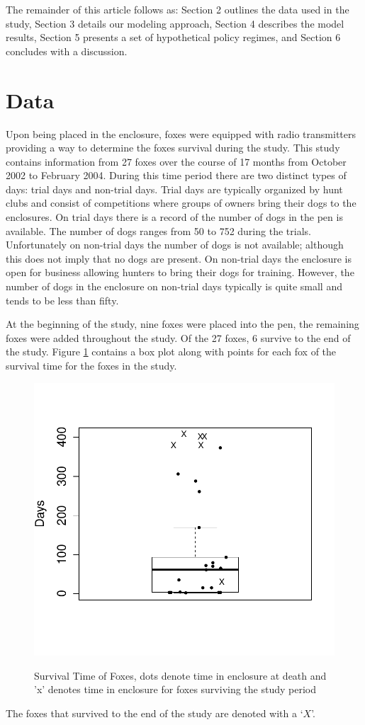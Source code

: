 \documentclass[aoas,preprint]{imsart}
\numberwithin{equation}{section}
\theoremstyle{plain}
\begin{document}
The remainder of this article follows as: Section 2 outlines the data used in the study, Section 3 details our modeling approach, Section 4 describes the model results, Section 5 presents a set of hypothetical policy regimes, and Section 6 concludes with a discussion.
\section{Data} Upon being placed in the enclosure, foxes were equipped with radio transmitters providing a way to determine the foxes survival during the study. This study contains information from 27 foxes over the course of 17 months from October 2002 to February 2004. During this time period there are two distinct types of days: trial days and non-trial days. Trial days are typically organized by hunt clubs and consist of competitions where groups of owners bring their dogs to the enclosures. On trial days there is a record of the number of dogs in the pen is available. The number of dogs ranges from 50 to 752 during the trials. Unfortunately on non-trial days the number of dogs is not available; although this does not imply that no dogs are present. On non-trial days the enclosure is open for business allowing hunters to bring their dogs for training. However, the number of dogs in the enclosure on non-trial days typically is quite small and tends to be less than fifty.

At the beginning of the study, nine foxes were placed into the pen, the remaining foxes were added throughout the study. Of the 27 foxes, 6 survive to the end of the study. Figure \ref{fig:SurvTime} contains a box plot along with points for each fox of the survival time for the foxes in the study. 
\begin{figure}[h!]
\begin{center}
\caption{Survival Time of Foxes, dots denote time in enclosure at death and 'x' denotes time in enclosure for foxes surviving the study period}
\includegraphics[width=.75\textwidth]{Survival_Time.pdf}
\label{fig:SurvTime}
\end{center}
\end{figure}
The foxes that survived to the end of the study are denoted with a `$X$'. 
\end{document}
